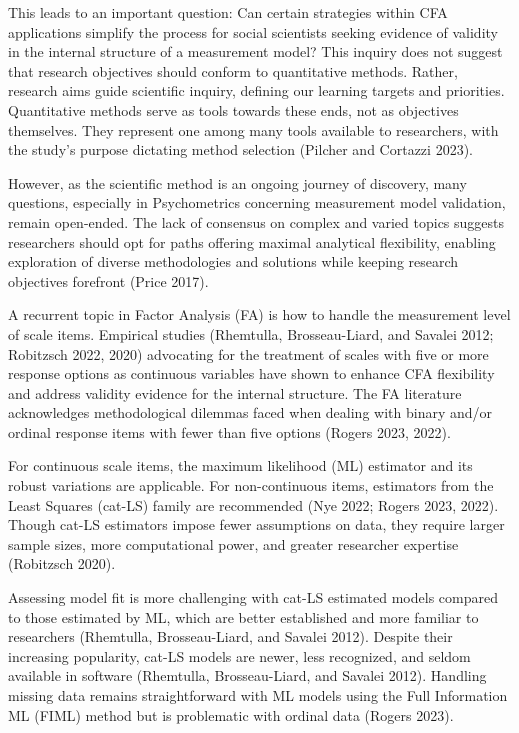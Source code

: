 \documentclass[
  a4paper,
]{article}
\begin{document}
This leads to an important question: Can certain strategies within CFA
applications simplify the process for social scientists seeking evidence
of validity in the internal structure of a measurement model? This
inquiry does not suggest that research objectives should conform to
quantitative methods. Rather, research aims guide scientific inquiry,
defining our learning targets and priorities. Quantitative methods serve
as tools towards these ends, not as objectives themselves. They
represent one among many tools available to researchers, with the
study's purpose dictating method selection (Pilcher and Cortazzi 2023).

However, as the scientific method is an ongoing journey of discovery,
many questions, especially in Psychometrics concerning measurement model
validation, remain open-ended. The lack of consensus on complex and
varied topics suggests researchers should opt for paths offering maximal
analytical flexibility, enabling exploration of diverse methodologies
and solutions while keeping research objectives forefront (Price 2017).

A recurrent topic in Factor Analysis (FA) is how to handle the
measurement level of scale items. Empirical studies (Rhemtulla,
Brosseau-Liard, and Savalei 2012; Robitzsch 2022, 2020) advocating for
the treatment of scales with five or more response options as continuous
variables have shown to enhance CFA flexibility and address validity
evidence for the internal structure. The FA literature acknowledges
methodological dilemmas faced when dealing with binary and/or ordinal
response items with fewer than five options (Rogers 2023, 2022).

For continuous scale items, the maximum likelihood (ML) estimator and
its robust variations are applicable. For non-continuous items,
estimators from the Least Squares (cat-LS) family are recommended (Nye
2022; Rogers 2023, 2022). Though cat-LS estimators impose fewer
assumptions on data, they require larger sample sizes, more
computational power, and greater researcher expertise (Robitzsch 2020).

Assessing model fit is more challenging with cat-LS estimated models
compared to those estimated by ML, which are better established and more
familiar to researchers (Rhemtulla, Brosseau-Liard, and Savalei 2012).
Despite their increasing popularity, cat-LS models are newer, less
recognized, and seldom available in software (Rhemtulla, Brosseau-Liard,
and Savalei 2012). Handling missing data remains straightforward with ML
models using the Full Information ML (FIML) method but is problematic
with ordinal data (Rogers 2023).
\end{document}
